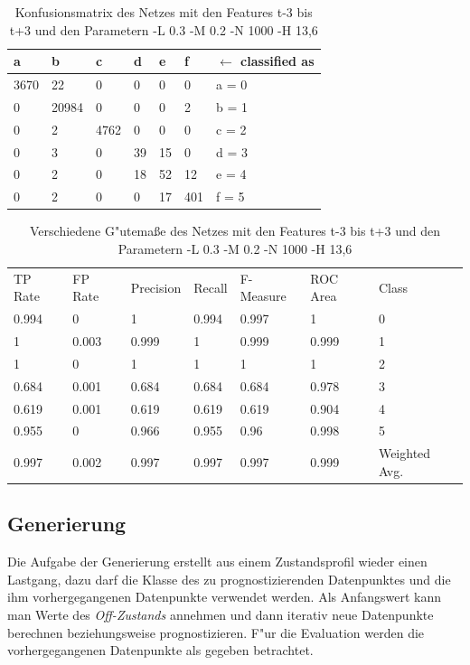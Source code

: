 \begin{table}[p]
\begin{tabular}{llllll|l}
a & b & c & d & e & f & $\leftarrow$ classified as  \\
\hline
3670 & 22 & 0 & 0 & 0 & 0 & a = 0  \\
0 & 20984 & 0 & 0 & 0 & 2 & b = 1  \\
0 & 2 & 4762 & 0 & 0 & 0 & c = 2  \\
0 & 3 & 0 & 39 & 15 & 0 & d = 3  \\
0 & 2 & 0 & 18 & 52 & 12 & e = 4  \\
0 & 2 & 0 & 0 & 17 & 401 & f = 5  \\
\end{tabular}
\caption[Konfusionsmatrix]{Konfusionsmatrix des Netzes mit den Features t-3 bis t+3 und den Parametern -L 0.3 -M 0.2 -N 1000 -H 13,6}
\label{EvalConf}
\end{table}

\begin{table}[h]
\begin{tabular}{llllll|l}
TP Rate & FP Rate & Precision & Recall & F-Measure & ROC Area & Class  \\
0.994 & 0 & 1 & 0.994 & 0.997 & 1 & 0  \\
1 & 0.003 & 0.999 & 1 & 0.999 & 0.999 & 1  \\
1 & 0 & 1 & 1 & 1 & 1 & 2  \\
0.684 & 0.001 & 0.684 & 0.684 & 0.684 & 0.978 & 3  \\
0.619 & 0.001 & 0.619 & 0.619 & 0.619 & 0.904 & 4  \\
0.955 & 0 & 0.966 & 0.955 & 0.96 & 0.998 & 5  \\
 \hline
0.997 & 0.002 & 0.997 & 0.997 & 0.997 & 0.999 & Weighted Avg. \\
\end{tabular}
\caption[Gütema{\ss}e]{Verschiedene G"utema{\ss}e des Netzes mit den Features t-3 bis t+3 und den Parametern -L 0.3 -M 0.2 -N 1000 -H 13,6}
\label{EvalPrec}
\end{table}

\newpage
\subsection{Generierung}
\label{EvalGenerierung}
Die Aufgabe der Generierung erstellt aus einem Zustandsprofil wieder einen Lastgang, dazu darf die Klasse des zu prognostizierenden Datenpunktes und die ihm vorhergegangenen Datenpunkte verwendet werden. Als Anfangswert kann man Werte des \textit{Off-Zustands} annehmen und dann iterativ neue Datenpunkte berechnen beziehungsweise prognostizieren. F"ur die Evaluation werden die vorhergegangenen Datenpunkte als gegeben betrachtet. \\


